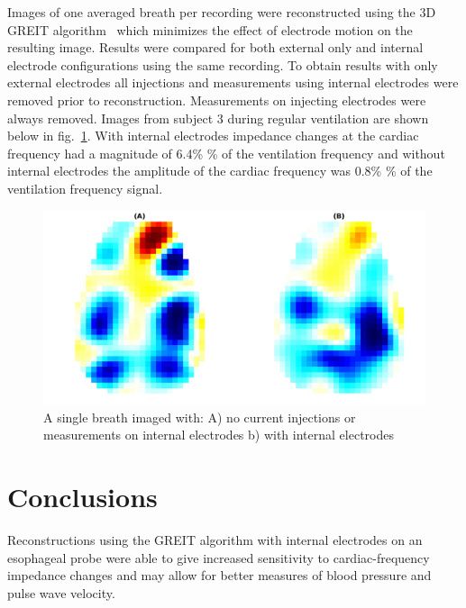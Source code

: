 Images of one averaged breath per recording
were reconstructed using the 3D GREIT 
algorithm~\cite{bartek2016} which minimizes the effect
of electrode motion on the resulting image.
Results were compared for both 
external only and internal electrode configurations
using the same recording.
To obtain results with only external electrodes  all 
injections and measurements using internal electrodes 
were removed prior to reconstruction. 
Measurements on injecting electrodes were always removed.
Images from subject 3 during regular ventilation are 
shown  below in fig.~\ref{fig:img_example}.
With internal electrodes impedance changes at the cardiac frequency had a magnitude of 6.4\% \%
of the ventilation frequency and without internal electrodes the amplitude of the cardiac frequency
was 0.8\% \% of the ventilation frequency signal.
\begin{figure}
\centering
\includegraphics[width=.96\columnwidth]{chapter_5/imgs/lamb_imgs.pdf}
\caption[Reconstructed image of a single breath]{\label{fig:img_example}%
A single breath imaged with:
A) no current injections or measurements on internal
electrodes 
b) with internal electrodes
}
\label{fig:img_example}
\end{figure}
\section{Conclusions}
Reconstructions using the GREIT algorithm
with internal electrodes on 
an esophageal probe were able to give increased
sensitivity to cardiac-frequency impedance changes 
and may allow for better measures of blood pressure and pulse
wave velocity.   



